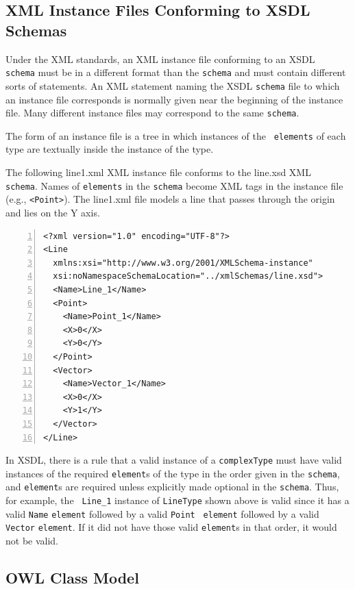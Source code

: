 \documentclass[preprint,12pt]{elsarticle}
\newenvironment{mylisting}
{\begin{list}{}{\setlength{\leftmargin}{1em}}\item\small}
{\end{list}}
\begin{document}
\subsection{XML Instance Files Conforming to XSDL Schemas}
\label{xmlInstanceFiles}

Under the XML standards, an XML instance file conforming to an XSDL {\tt
  schema} must be in a different format than the {\tt schema} and must
contain different sorts of statements. An XML statement naming the XSDL
{\tt schema} file to which an instance file corresponds is normally given
near the beginning of the instance file. Many different instance files may
correspond to the same {\tt schema}.

The form of an instance file is a tree in which instances of the {\tt
  elements} of each type are textually inside the instance of the type.

The following line1.xml XML instance file conforms to the line.xsd XML {\tt
  schema}. Names of {\tt elements} in the {\tt schema} become XML tags in
the instance file (e.g., {\tt <Point>}). The line1.xml file models a line
that passes through the origin and lies on the Y axis.

\begin{mylisting}
\begin{Verbatim}[commandchars=\\\{\},numbers=left, numbersep=1pt]
<?xml version="1.0" encoding="UTF-8"?>
<Line
  xmlns:xsi="http://www.w3.org/2001/XMLSchema-instance"
  xsi:noNamespaceSchemaLocation="../xmlSchemas/line.xsd">
  <Name>Line_1</Name>
  <Point>
    <Name>Point_1</Name>
    <X>0</X>
    <Y>0</Y>
  </Point>
  <Vector>
    <Name>Vector_1</Name>
    <X>0</X>
    <Y>1</Y>
  </Vector>
</Line>
\end{Verbatim}
\label{test3}
\end{mylisting}

In XSDL, there is a rule that a valid instance of a {\tt complexType} must
have valid instances of the required {\tt element}s of the type in the
order given in the {\tt schema}, and {\tt element}s are required unless
explicitly made optional in the {\tt schema}. Thus, for example, the {\tt
  Line\_1} instance of {\tt LineType} shown above is valid since it has a
valid {\tt Name} {\tt element} followed by a valid {\tt Point} {\tt
  element} followed by a valid {\tt Vector} {\tt element}. If it did not
have those valid {\tt element}s in that order, it would not be valid.

\subsection{OWL Class Model}
\label{owlClassModel}
\end{document}
